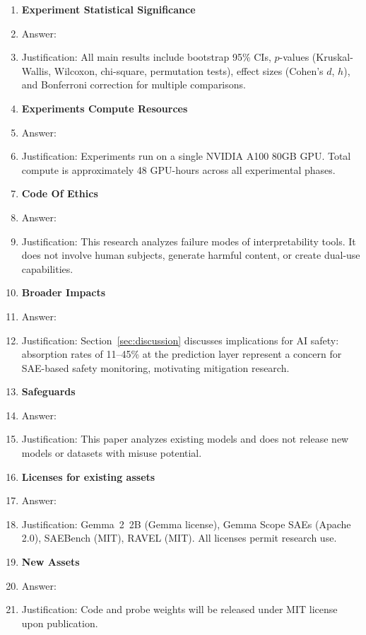 \documentclass{article}
\begin{document}
\begin{enumerate}
\item {\bf Experiment Statistical Significance}
    \item[] Answer: \answerYes{}
    \item[] Justification: All main results include bootstrap 95\% CIs, $p$-values (Kruskal-Wallis, Wilcoxon, chi-square, permutation tests), effect sizes (Cohen's $d$, $h$), and Bonferroni correction for multiple comparisons.

\item {\bf Experiments Compute Resources}
    \item[] Answer: \answerYes{}
    \item[] Justification: Experiments run on a single NVIDIA A100 80GB GPU. Total compute is approximately 48 GPU-hours across all experimental phases.

\item {\bf Code Of Ethics}
    \item[] Answer: \answerYes{}
    \item[] Justification: This research analyzes failure modes of interpretability tools. It does not involve human subjects, generate harmful content, or create dual-use capabilities.

\item {\bf Broader Impacts}
    \item[] Answer: \answerYes{}
    \item[] Justification: Section~\ref{sec:discussion} discusses implications for AI safety: absorption rates of 11--45\% at the prediction layer represent a concern for SAE-based safety monitoring, motivating mitigation research.

\item {\bf Safeguards}
    \item[] Answer: \answerNA{}
    \item[] Justification: This paper analyzes existing models and does not release new models or datasets with misuse potential.

\item {\bf Licenses for existing assets}
    \item[] Answer: \answerYes{}
    \item[] Justification: Gemma~2~2B (Gemma license), Gemma Scope SAEs (Apache 2.0), SAEBench (MIT), RAVEL (MIT). All licenses permit research use.

\item {\bf New Assets}
    \item[] Answer: \answerYes{}
    \item[] Justification: Code and probe weights will be released under MIT license upon publication.


\end{enumerate}
\end{document}
